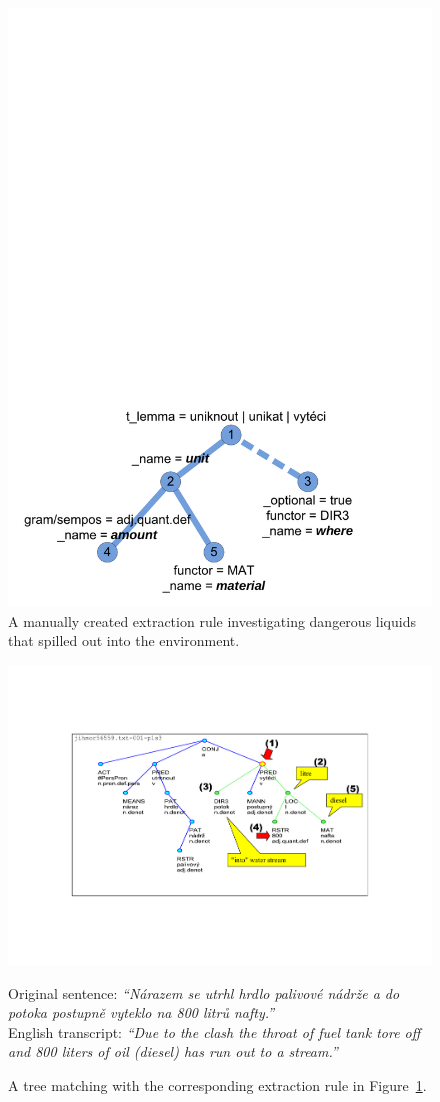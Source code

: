 \begin{figure}
	\centering
		\includegraphics[width=0.5\hsize]{../img/ch3_eenv_extract_patern}
	\caption{A manually created extraction rule investigating dangerous liquids that spilled out into the environment.}
	\label{fig:ch3_eenv_extract_patern}
\end{figure}


\begin{figure}
	\centering
		\includegraphics[angle=-90, width=0.6\hsize]{../img/ch3_eenv_matching_tree}
		
Original sentence: 
\emph{``Nárazem se utrhl hrdlo palivové nádrže a do potoka postupně vyteklo na 800 litrů nafty.''}\\
English transcript: 
\emph{``Due to the clash the throat of fuel tank tore off and 800 liters of oil (diesel) has run out to a stream.''}
	\caption{A tree matching with the corresponding extraction rule in Figure~\ref{fig:ch3_eenv_extract_patern}.}
	\label{fig:ch3_eenv_matching_tree}
\end{figure}


